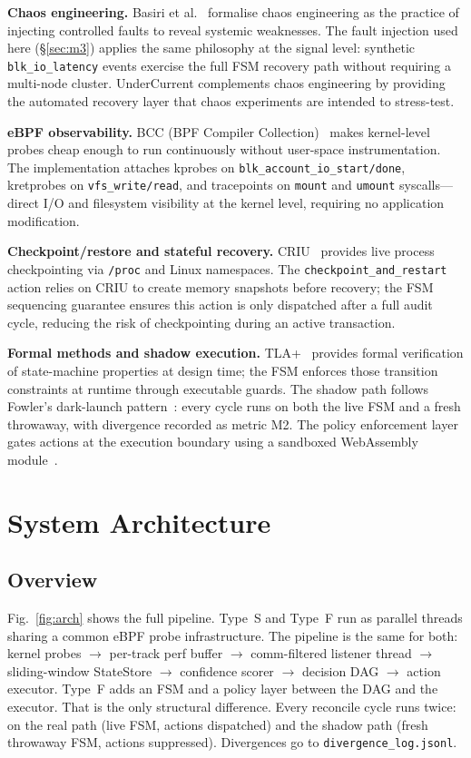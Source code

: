 \documentclass[conference]{IEEEtran}
\begin{document}
\textbf{Chaos engineering.} Basiri et al.~\cite{b3} formalise chaos engineering as the practice of injecting controlled faults to reveal systemic weaknesses. The fault injection used here (§\ref{sec:m3}) applies the same philosophy at the signal level: synthetic \texttt{blk\_io\_latency} events exercise the full FSM recovery path without requiring a multi-node cluster. UnderCurrent complements chaos engineering by providing the automated recovery layer that chaos experiments are intended to stress-test.

\textbf{eBPF observability.} BCC (BPF Compiler Collection)~\cite{b6} makes kernel-level probes cheap enough to run continuously without user-space instrumentation. The implementation attaches kprobes on \texttt{blk\_account\_io\_start/done}, kretprobes on \texttt{vfs\_write/read}, and tracepoints on \texttt{mount} and \texttt{umount} syscalls---direct I/O and filesystem visibility at the kernel level, requiring no application modification.

\textbf{Checkpoint/restore and stateful recovery.} CRIU~\cite{b2} provides live process checkpointing via \texttt{/proc} and Linux namespaces. The \texttt{checkpoint\_and\_restart} action relies on CRIU to create memory snapshots before recovery; the FSM sequencing guarantee ensures this action is only dispatched after a full audit cycle, reducing the risk of checkpointing during an active transaction.

\textbf{Formal methods and shadow execution.} TLA+~\cite{b9} provides formal verification of state-machine properties at design time; the FSM enforces those transition constraints at runtime through executable guards. The shadow path follows Fowler's dark-launch pattern~\cite{b5}: every cycle runs on both the live FSM and a fresh throwaway, with divergence recorded as metric M2. The policy enforcement layer gates actions at the execution boundary using a sandboxed WebAssembly module~\cite{b4}.

\section{System Architecture}
\label{sec:arch}

\subsection{Overview}

Fig.~\ref{fig:arch} shows the full pipeline. Type~S and Type~F run as parallel threads sharing a common eBPF probe infrastructure. The pipeline is the same for both: kernel probes $\rightarrow$ per-track perf buffer $\rightarrow$ comm-filtered listener thread $\rightarrow$ sliding-window StateStore $\rightarrow$ confidence scorer $\rightarrow$ decision DAG $\rightarrow$ action executor. Type~F adds an FSM and a policy layer between the DAG and the executor. That is the only structural difference. Every reconcile cycle runs twice: on the real path (live FSM, actions dispatched) and the shadow path (fresh throwaway FSM, actions suppressed). Divergences go to \texttt{divergence\_log.jsonl}.
\end{document}
